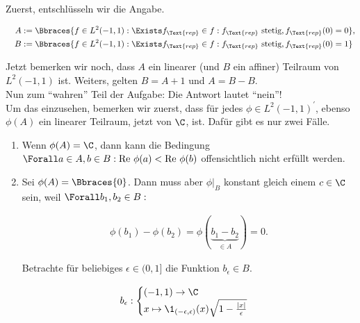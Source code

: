 \begin{solution}

Zuerst, entschlüsseln wir die Angabe.

\begin{align*}
  A & :=
  \Bbraces
  {
    f \in L^2(-1, 1):
    \Exists f_\Text{rep} \in f:
    f_\Text{rep} \text{ stetig},
    f_\Text{rep}(0) = 0
  }, \\
  \quad
  B & :=
  \Bbraces
  {
    f \in L^2(-1, 1):
    \Exists f_\Text{rep} \in f:
    f_\Text{rep} \text{ stetig},
    f_\Text{rep}(0) = 1
  }
\end{align*}

Jetzt bemerken wir noch, dass $A$ ein linearer (und $B$ ein affiner) Teilraum von $L^2(-1, 1)$ ist.
Weiters, gelten $B = A + 1$ und $A = B - B$. \\

Nun zum \enquote{wahren} Teil der Aufgabe:
Die Antwort lautet \enquote{nein}! \\

Um das einzusehen, bemerken wir zuerst, dass für jedes $\phi \in L^2(-1, 1)^\prime$, ebenso $\phi(A)$ ein linearer Teilraum, jetzt von
$\C$, ist.
Dafür gibt es nur zwei Fälle.

\begin{enumerate}[label = Fall \arabic*:]

  \item
  Wenn $\phi(A) = \C$, dann kann die Bedingung $\Forall a \in A, b \in B: \text{Re } \phi(a) < \text{Re } \phi(b)$
  offensichtlich nicht erfüllt werden.

  \item
  Sei $\phi(A) = \Bbraces{0}$.
  Dann muss aber $\phi|_B$ konstant gleich einem $c \in \C$ sein, weil $\Forall b_1, b_2 \in B:$

  \begin{align*}
    \phi(b_1) - \phi(b_2)
    =
    \phi(\underbrace{b_1 - b_2}_{\in A})
    =
    0.
  \end{align*}

  Betrachte für beliebiges $\epsilon \in (0, 1]$ die Funktion $b_\epsilon \in B$.

  \begin{align*}
    b_\epsilon:
    \begin{cases}
      (-1, 1) \to \C \\
      x \mapsto
      \1_{(-\epsilon, \epsilon)}(x)
      \sqrt{1 - \frac{|x|}{\epsilon}}
    \end{cases}
  \end{align*}


\end{enumerate}
\end{solution}

